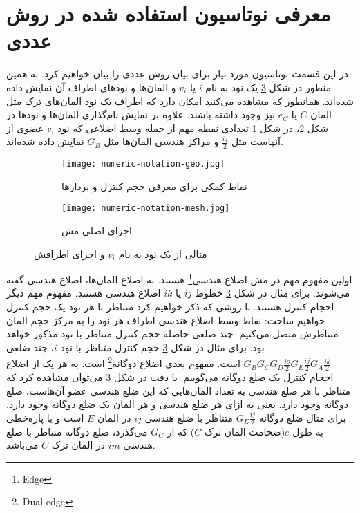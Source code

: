 \section{معرفی نوتاسیون استفاده شده در روش عددی}
در این قسمت نوتاسیون مورد نیاز برای بیان روش عددی را بیان خواهیم کرد. به همین منظور در شکل \ref{fig:3not} یک نود به نام $i$ یا $v_i$ و المان‌ها و نود‌های اطراف آن نمایش داده شده‌اند. همانطور که مشاهده می‌کنید امکان دارد که اطراف یک نود المان‌های ترک مثل المان $C$ یا $e_C$ نیز وجود داشته باشند. علاوه بر نمایش نام‌گذاری المان‌ها و نود‌ها در شکل \ref{fig:3not-mesh}، در شکل \ref{fig:3not-geo} تعدادی نقطه مهم از جمله وسط اضلاعی که نود $v_i$ عضوی از آنهاست مثل $\frac{ij}{2}$ و مراکز هندسی المان‌ها مثل $G_B$ نمایش داده شده‌اند. 

\begin{figure}
\begin{subfigure}{0.5\textwidth}
\texttt{[image: numeric-notation-geo.jpg]} 
\caption{نقاط کمکی برای معرفی حجم کنترل و بردارها}
\label{fig:3not-geo}
\end{subfigure}
\begin{subfigure}{0.5\textwidth}
\texttt{[image: numeric-notation-mesh.jpg]} 
\caption{اجزای اصلی مش}
\label{fig:3not-mesh}
\end{subfigure}

\caption{مثالی از یک نود به نام $v_i$ و اجزای اطرافش}
\label{fig:3not}
\end{figure}

اولین مفهوم مهم در مش اضلاع هندسی\footnote{Edge} هستند. به اضلاع المان‌ها، اضلاع هندسی گفته می‌شوند. برای مثال در شکل \ref{fig:3not} خطوط $ij$ یا $ik$ اضلاع هندسی هستند. مفهوم مهم دیگر احجام کنترل هستند. با روشی که ذکر خواهیم کرد متناظر با هر نود یک حجم کنترل خواهیم ساخت: نقاط وسط اضلاع هندسی اطراف هر نود را به مرکز حجم المان متناظرش متصل می‌کنیم. چند ضلعی حاصله حجم کنترل متناظر با نود مذکور خواهد بود. برای مثال در شکل \ref{fig:3not} حجم کنترل متناظر با نود $i$، چند ضلعی 
$G_BG_CG_D\frac{io}{2}G_E\frac{ij}{2}G_A\frac{ik}{2}$
است. مفهوم بعدی اضلاع دوگانه\footnote{Dual-edge} است. به هر یک از اضلاع احجام کنترل یک ضلع دوگانه می‌گوییم. با دقت در شکل \ref{fig:3not} می‌توان مشاهده کرد که متناظر با هر ضلع هندسی به تعداد المان‌هایی که این ضلع هندسی عضو آن‌هاست، ضلع دوگانه وجود دارد. یعنی به ازای هر ضلع هندسی و هر المان یک ضلع دوگانه وجود دارد. برای مثال ضلع دوگانه 
$G_E\frac{ij}{2}$
متناظر با ضلع هندسی $ij$ در المان $E$ است و یا  پاره‌خطی به طول $e$(ضخامت المان ترک $C$) که از $G_C$ می‌گذرد، ضلع دوگانه متناظر با ضلع هندسی $im$ در المان ترک $C$ می‌باشد.

